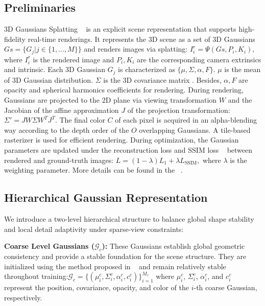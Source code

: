\documentclass{article}
\begin{document}
  \subsection{Preliminaries}
  \label{subsec:prel}
  3D Gaussians Splatting ~\cite{kerbl20233d} is an explicit scene representation that supports high-fidelity real-time renderings. It represents the 3D scene as a set of 3D Gaussians 
  $Gs=\{ G_j| j\in \{1, ..., M \} \}$
  and renders images via splatting: 
  $I^r_{i} =  \Psi(Gs, P_i, K_i),$
  where $I^r_{i}$ is the rendered image and $P_i, K_i$ are the corresponding camera extrinsics and intrinsic.
  Each 3D Gaussian $G_j$ is characterized as $\{ \mu, \Sigma, \alpha, F \}$.
  $\mu$ is the mean of 3D Gaussian distribution. 
  $\Sigma$ is the 3D covariance matrix
  . 
  Besides, $\alpha, F$  are opacity and spherical harmonics coefficients for rendering.
  During rendering, Gaussians are projected to the 2D plane via viewing transformation $W$ and the Jacobian of the affine approximation $J$ of the projection transformation:
  $\Sigma ' = JW \Sigma W^{T} J^{T}.$
  The final color $C$ of each pixel is acquired in an alpha-blending way according to the depth order of the $O$ overlapping Gaussians.
  A tile-based rasterizer is used for efficient rendering.
  During optimization, the Gaussian parameters are updated under the reconstruction loss and SSIM loss ~\cite{wang2004image} between rendered and ground-truth images: $L = (1-\lambda)L_1 + \lambda L_\text{SSIM},$
  where $\lambda$ is the weighting parameter.
  More details can be found in the ~\cite{kerbl20233d}. 
  
  \subsection{Hierarchical Gaussian Representation}
  \label{subsec:hier}
  We introduce a two-level hierarchical structure to balance global shape stability and local detail adaptivity under sparse-view constraints:
  
  \noindent\textbf{Coarse Level Gaussians ($\mathcal{G}_c$):} These Gaussians establish global geometric consistency and provide a stable foundation for the scene structure. They are initialized using the method proposed in ~\cite{zheng2025nexusgs} and remain relatively stable throughout training:$\mathcal{G}_c = \{(\mu_i^c, \Sigma_i^c, \alpha_i^c, c_i^c)\}_{i=1}^{M_c}$
  where $\mu_i^c$, $\Sigma_i^c$, $\alpha_i^c$, and $c_i^c$ represent the position, covariance, opacity, and color of the $i$-th coarse Gaussian, respectively.
  
\end{document}
